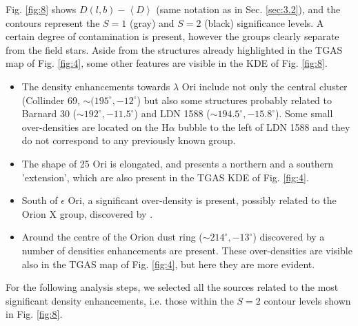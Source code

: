 \documentclass[twocolumn]{aa}
\begin{document}
Fig. \ref{fig:8} shows $D(l, b) - \left\langle D \right\rangle$ (same notation as in Sec. \ref{sec:3.2}), and the contours represent the $S = 1$ (gray) and $S = 2$ (black) significance levels. A certain degree of contamination is present, however the groups clearly separate from the field stars.
Aside from the structures already highlighted in the TGAS map of Fig. \ref{fig:4}, some other features are visible in the KDE of Fig. \ref{fig:8}.

\begin{itemize}
\item The density enhancements towards $\lambda$ Ori include not only the central cluster (Collinder 69, $\sim (195^{\circ}, -12^{\circ}$) but also  some structures probably related to Barnard 30 ($\sim 192^{\circ}, -11.5^{\circ}$) and LDN 1588 ($\sim 194.5^{\circ}, -15.8^{\circ}$). Some small over-densities are located on the H$\alpha$ bubble to the left of LDN 1588 and they do not correspond to any  previously known group.

\item The shape of 25 Ori is elongated, and presents a northern and a southern 'extension', which are also present in the TGAS KDE of Fig. \ref{fig:4}.

\item South of $\epsilon$ Ori, a significant over-density is present, possibly related to the Orion X group, discovered by \cite{Bouy2015}.

\item Around the centre of the Orion dust ring ($\sim 214^{\circ}, -13^{\circ}$) discovered by \cite{Schlafly2015} a number of densities enhancements are present. These over-densities are visible also in the TGAS map of Fig. \ref{fig:4}, but here they are more evident.
\end{itemize}

\noindent
For the following analysis steps, we selected all the sources related to the most significant density enhancements, i.e. those within the $S = 2$ contour levels shown in Fig. \ref{fig:8}. 
\end{document}
